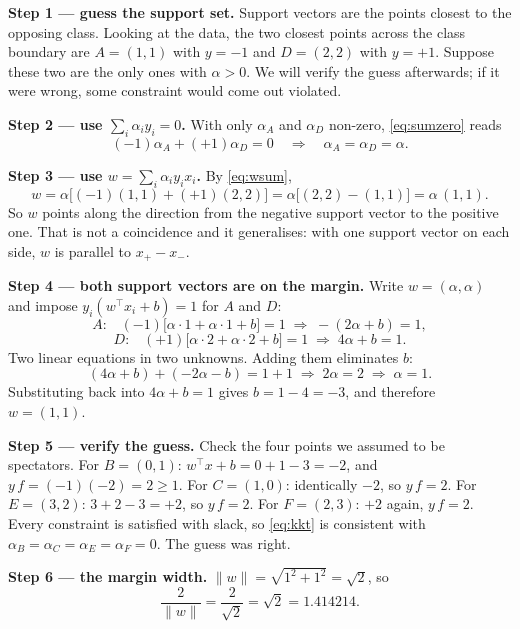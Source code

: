 \documentclass[11pt]{article}
\begin{document}
\begin{worked}
\textbf{Step 1 --- guess the support set.} Support vectors are the points
closest to the opposing class. Looking at the data, the two closest points
across the class boundary are $A = (1,1)$ with $y = -1$ and $D = (2,2)$ with
$y = +1$. Suppose these two are the only ones with $\alpha > 0$. We will
verify the guess afterwards; if it were wrong, some constraint would come out
violated.

\textbf{Step 2 --- use $\sum_i \alpha_i y_i = 0$.} With only $\alpha_A$ and
$\alpha_D$ non-zero, \eqref{eq:sumzero} reads
\[
  (-1)\alpha_A + (+1)\alpha_D = 0
  \quad\Longrightarrow\quad
  \alpha_A = \alpha_D = \alpha .
\]

\textbf{Step 3 --- use $w = \sum_i \alpha_i y_i x_i$.} By \eqref{eq:wsum},
\[
  w = \alpha\bigl[(-1)(1,1) + (+1)(2,2)\bigr]
    = \alpha\bigl[(2,2) - (1,1)\bigr]
    = \alpha\,(1,1) .
\]
So $w$ points along the direction from the negative support vector to the
positive one. That is not a coincidence and it generalises: with one support
vector on each side, $w$ is parallel to $x_+ - x_-$.

\textbf{Step 4 --- both support vectors are on the margin.} Write
$w = (\alpha, \alpha)$ and impose $y_i(w^\top x_i + b) = 1$ for $A$ and $D$:
\[
  \text{$A$:}\quad (-1)\bigl[\alpha\cdot 1 + \alpha\cdot 1 + b\bigr] = 1
  \;\Longrightarrow\; -(2\alpha + b) = 1 ,
\]
\[
  \text{$D$:}\quad (+1)\bigl[\alpha\cdot 2 + \alpha\cdot 2 + b\bigr] = 1
  \;\Longrightarrow\; 4\alpha + b = 1 .
\]
Two linear equations in two unknowns. Adding them eliminates $b$:
\[
  (4\alpha + b) + (-2\alpha - b) = 1 + 1
  \;\Longrightarrow\; 2\alpha = 2
  \;\Longrightarrow\; \boxed{\alpha = 1} .
\]
Substituting back into $4\alpha + b = 1$ gives $b = 1 - 4 = \boxed{-3}$, and
therefore $\boxed{w = (1,1)}$.

\textbf{Step 5 --- verify the guess.} Check the four points we assumed to be
spectators. For $B = (0,1)$: $w^\top x + b = 0 + 1 - 3 = -2$, and
$y\,f = (-1)(-2) = 2 \ge 1$. For $C = (1,0)$: identically $-2$, so
$y\,f = 2$. For $E = (3,2)$: $3 + 2 - 3 = +2$, so $y\,f = 2$. For $F = (2,3)$:
$+2$ again, $y\,f = 2$. Every constraint is satisfied with slack, so
\eqref{eq:kkt} is consistent with $\alpha_B = \alpha_C = \alpha_E =
\alpha_F = 0$. The guess was right.

\textbf{Step 6 --- the margin width.} $\|w\| = \sqrt{1^2 + 1^2} = \sqrt2$, so
\[
  \frac{2}{\|w\|} = \frac{2}{\sqrt 2} = \sqrt 2 = 1.414214 .
\]
\end{worked}
\end{document}
